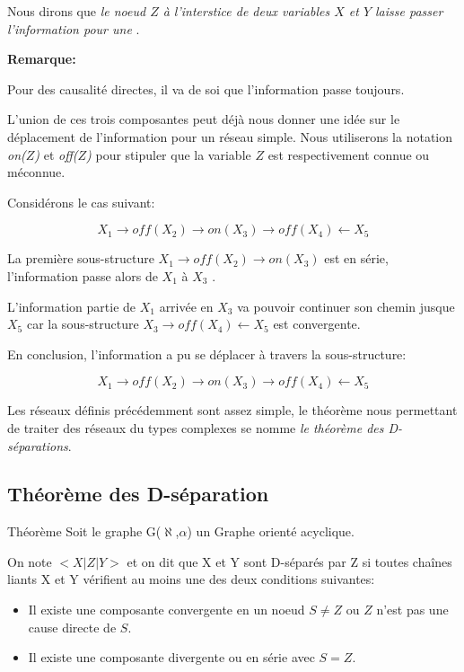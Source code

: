 \documentclass[a4paper]{article}
\begin{document}
Nous dirons que \emph{le noeud $Z$ à l'interstice de deux variables $X$ et $Y$ laisse passer l'information pour une }.

\textbf{Remarque:} 

Pour des causalité directes, il va de soi que l'information passe toujours.

L'union de ces trois composantes peut déjà  nous donner une idée sur le déplacement de l'information pour un réseau simple.
Nous utiliserons la notation \textit{on($Z$)} et \textit{off($Z$)} pour stipuler que la variable $Z$ est respectivement connue ou méconnue.


Considérons le cas suivant:


$$X_1\longrightarrow off(X_2) \longrightarrow on(X_3) \longrightarrow off(X_4) \longleftarrow X_5$$


La première sous-structure $X_1\longrightarrow off(X_2) \longrightarrow on(X_3)$ est en série, l'information passe alors  de $X_1$ à $X_3$ .
     
L'information partie de $X_1$ arrivée  en $X_3$ va pouvoir continuer son chemin jusque $X_5$ car la sous-structure  $X_3 \longrightarrow off(X_4) \longleftarrow X_5$  est convergente.  

En conclusion, l'information a pu se déplacer à travers la sous-structure: 

  $$X_1\longrightarrow off(X_2) \longrightarrow on(X_3) \longrightarrow off(X_4) \longleftarrow X_5$$  


Les réseaux définis précédemment sont  assez simple, le théorème nous permettant de traiter des réseaux du types complexes se nomme \emph{le théorème des D-séparations}.

\subsection{Théorème des D-séparation}

\begin{theorem}{Théorème}
Soit le graphe G($\aleph$,$\alpha$)  un Graphe orienté acyclique.

On note $<X|Z|Y>$  et on dit que X et Y sont D-séparés par Z si toutes  chaînes liants  X et Y vérifient au moins une des deux conditions suivantes:
\begin{itemize}
  \item Il existe  une composante convergente en un noeud $S \neq Z$ ou  $Z$ n'est pas une cause directe de $S$.
  \item Il existe  une composante divergente ou en série avec  $S=Z$.
\end{itemize}
\end{theorem}
\end{document}
